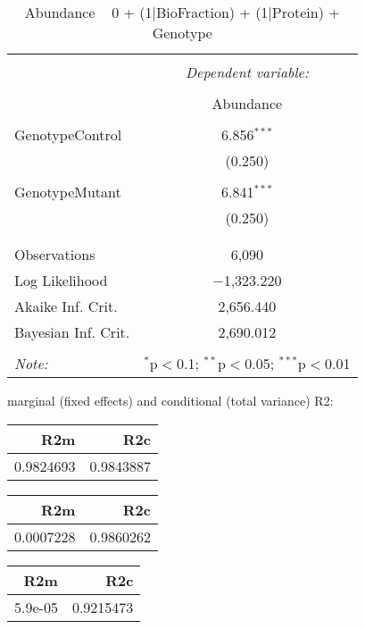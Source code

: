 \documentclass[11pt]{report}
\begin{document}
\begin{table}[!htbp] \centering 
  \caption{Abundance ~ 0 + (1|BioFraction) + (1|Protein) + Genotype} 
  \label{} 
\begin{tabular}{@{\extracolsep{5pt}}lc} 
\\[-1.8ex]\hline 
\hline \\[-1.8ex] 
 & \multicolumn{1}{c}{\textit{Dependent variable:}} \\ 
\cline{2-2} 
\\[-1.8ex] & Abundance \\ 
\hline \\[-1.8ex] 
 GenotypeControl & 6.856$^{***}$ \\ 
  & (0.250) \\ 
  & \\ 
 GenotypeMutant & 6.841$^{***}$ \\ 
  & (0.250) \\ 
  & \\ 
\hline \\[-1.8ex] 
Observations & 6,090 \\ 
Log Likelihood & $-$1,323.220 \\ 
Akaike Inf. Crit. & 2,656.440 \\ 
Bayesian Inf. Crit. & 2,690.012 \\ 
\hline 
\hline \\[-1.8ex] 
\textit{Note:}  & \multicolumn{1}{r}{$^{*}$p$<$0.1; $^{**}$p$<$0.05; $^{***}$p$<$0.01} \\ 
\end{tabular} 
\end{table} 
marginal (fixed effects) and conditional (total variance) R2:

\begin{tabular}{r|r}
\hline
R2m & R2c\\
\hline
0.9824693 & 0.9843887\\
\hline
\end{tabular}

\begin{tabular}{r|r}
\hline
R2m & R2c\\
\hline
0.0007228 & 0.9860262\\
\hline
\end{tabular}

\begin{tabular}{r|r}
\hline
R2m & R2c\\
\hline
5.9e-05 & 0.9215473\\
\hline
\end{tabular}
\end{document}
